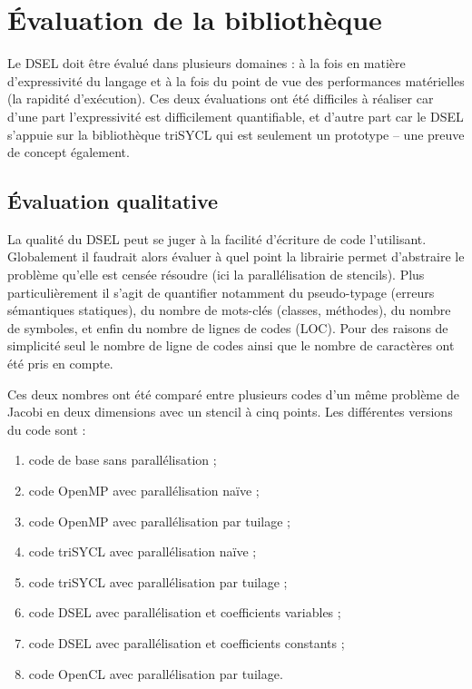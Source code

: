 
\chapter{\'Evaluation de la bibliothèque}

Le DSEL doit être évalué dans plusieurs domaines : à la fois en matière d'expressivité du langage et à la fois du point de vue des performances matérielles (la rapidité d'exécution). Ces deux évaluations ont été difficiles à réaliser car d'une part l'expressivité est difficilement quantifiable, et d'autre part car le DSEL s'appuie sur la bibliothèque \textsf{triSYCL} qui est seulement un prototype -- une preuve de concept également.


\section{\'Evaluation qualitative}

La qualité du DSEL peut se juger à la facilité d'écriture de code l'utilisant. Globalement il faudrait alors évaluer à quel point la librairie permet d'abstraire le problème qu'elle est censée résoudre (ici la parallélisation de stencils). Plus particulièrement il s'agit de quantifier notamment du pseudo-typage (erreurs sémantiques statiques), du nombre de mots-clés (classes, méthodes), du nombre de symboles, et enfin du nombre de lignes de codes (LOC). Pour des raisons de simplicité seul le nombre de ligne de codes ainsi que le nombre de caractères ont été pris en compte. 

Ces deux nombres ont été comparé entre plusieurs codes d'un même problème de Jacobi en deux dimensions avec un stencil à cinq points. Les différentes versions du code sont :
\begin{enumerate}
\item code de base sans parallélisation ;
\item code \textsf{OpenMP} avec parallélisation naïve ;
\item code \textsf{OpenMP} avec parallélisation par tuilage ;
\item code \textsf{triSYCL} avec parallélisation naïve ;
\item code \textsf{triSYCL} avec parallélisation par tuilage ;
\item code \textsf{DSEL} avec parallélisation et coefficients variables ;
\item code \textsf{DSEL} avec parallélisation et coefficients constants ;
\item code \textsf{OpenCL} avec parallélisation par tuilage.
\end{enumerate}

